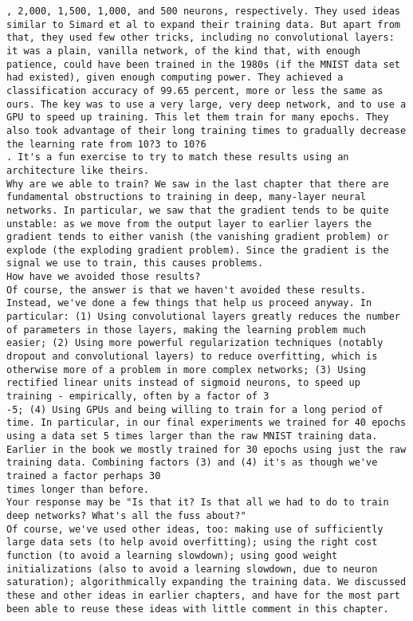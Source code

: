 \begin{lstlisting}
, 2,000, 1,500, 1,000, and 500 neurons, respectively. They used ideas similar to Simard et al to expand their training data. But apart from that, they used few other tricks, including no convolutional layers: it was a plain, vanilla network, of the kind that, with enough patience, could have been trained in the 1980s (if the MNIST data set had existed), given enough computing power. They achieved a classification accuracy of 99.65 percent, more or less the same as ours. The key was to use a very large, very deep network, and to use a GPU to speed up training. This let them train for many epochs. They also took advantage of their long training times to gradually decrease the learning rate from 10?3 to 10?6
. It's a fun exercise to try to match these results using an architecture like theirs.
Why are we able to train? We saw in the last chapter that there are fundamental obstructions to training in deep, many-layer neural networks. In particular, we saw that the gradient tends to be quite unstable: as we move from the output layer to earlier layers the gradient tends to either vanish (the vanishing gradient problem) or explode (the exploding gradient problem). Since the gradient is the signal we use to train, this causes problems.
How have we avoided those results? 
Of course, the answer is that we haven't avoided these results. Instead, we've done a few things that help us proceed anyway. In particular: (1) Using convolutional layers greatly reduces the number of parameters in those layers, making the learning problem much easier; (2) Using more powerful regularization techniques (notably dropout and convolutional layers) to reduce overfitting, which is otherwise more of a problem in more complex networks; (3) Using rectified linear units instead of sigmoid neurons, to speed up training - empirically, often by a factor of 3
-5; (4) Using GPUs and being willing to train for a long period of time. In particular, in our final experiments we trained for 40 epochs using a data set 5 times larger than the raw MNIST training data. Earlier in the book we mostly trained for 30 epochs using just the raw training data. Combining factors (3) and (4) it's as though we've trained a factor perhaps 30
times longer than before.
Your response may be "Is that it? Is that all we had to do to train deep networks? What's all the fuss about?"
Of course, we've used other ideas, too: making use of sufficiently large data sets (to help avoid overfitting); using the right cost function (to avoid a learning slowdown); using good weight initializations (also to avoid a learning slowdown, due to neuron saturation); algorithmically expanding the training data. We discussed these and other ideas in earlier chapters, and have for the most part been able to reuse these ideas with little comment in this chapter.

\end{lstlisting}
